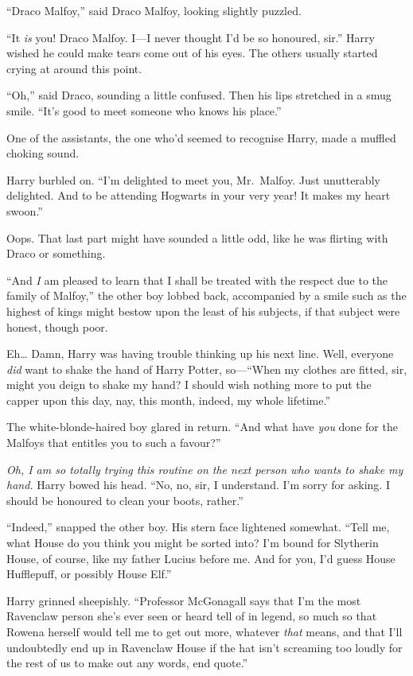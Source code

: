 ``Draco Malfoy,'' said Draco Malfoy, looking slightly puzzled.

``It \emph{is} you! Draco Malfoy. I---I never thought I'd be so
honoured, sir.'' Harry wished he could make tears come out of his eyes.
The others usually started crying at around this point.

``Oh,'' said Draco, sounding a little confused. Then his lips stretched
in a smug smile. ``It's good to meet someone who knows his place.''

One of the assistants, the one who'd seemed to recognise Harry, made a
muffled choking sound.

Harry burbled on. ``I'm delighted to meet you, Mr.~Malfoy. Just
unutterably delighted. And to be attending Hogwarts in your very year!
It makes my heart swoon.''

Oops. That last part might have sounded a little odd, like he was
flirting with Draco or something.

``And \emph{I} am pleased to learn that I shall be treated with the
respect due to the family of Malfoy,'' the other boy lobbed back,
accompanied by a smile such as the highest of kings might bestow upon
the least of his subjects, if that subject were honest, though poor.

Eh\ldots{} Damn, Harry was having trouble thinking up his next line.
Well, everyone \emph{did} want to shake the hand of Harry Potter,
so---``When my clothes are fitted, sir, might you deign to shake my
hand? I should wish nothing more to put the capper upon this day, nay,
this month, indeed, my whole lifetime.''

The white-blonde-haired boy glared in return. ``And what have \emph{you}
done for the Malfoys that entitles you to such a favour?''

\emph{Oh, I am so totally trying this routine on the next person who
wants to shake my hand.} Harry bowed his head. ``No, no, sir, I
understand. I'm sorry for asking. I should be honoured to clean your
boots, rather.''

``Indeed,'' snapped the other boy. His stern face lightened somewhat.
``Tell me, what House do you think you might be sorted into? I'm bound
for Slytherin House, of course, like my father Lucius before me. And for
you, I'd guess House Hufflepuff, or possibly House Elf.''

Harry grinned sheepishly. ``Professor McGonagall says that I'm the most
Ravenclaw person she's ever seen or heard tell of in legend, so much so
that Rowena herself would tell me to get out more, whatever \emph{that}
means, and that I'll undoubtedly end up in Ravenclaw House if the hat
isn't screaming too loudly for the rest of us to make out any words, end
quote.''

